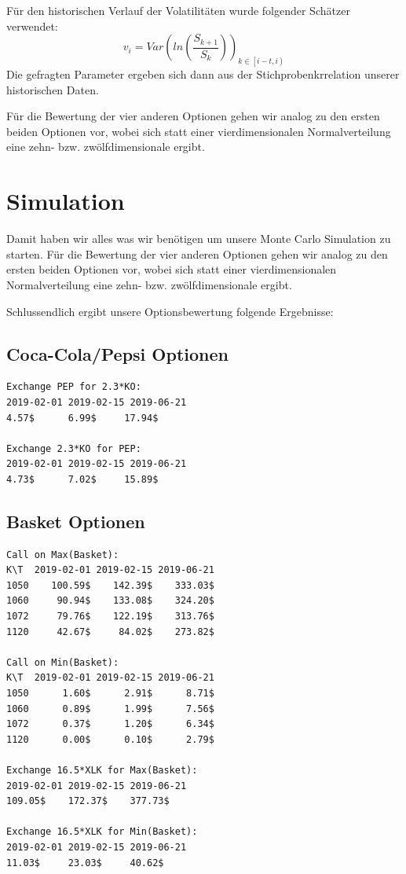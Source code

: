 \documentclass[12pt]{article}
\begin{document}
Für den historischen Verlauf der Volatilitäten wurde folgender Schätzer verwendet:
\begin{equation*}
v_i=Var\left(ln\left(\frac{S_{k+1}}{S_k}\right)\right)_{k\in\left[i-t,i\right)}
\end{equation*}
Die gefragten Parameter ergeben sich dann aus der Stichprobenkrrelation unserer historischen Daten.

Für die Bewertung der vier anderen Optionen gehen wir analog zu den ersten beiden Optionen vor, wobei sich statt einer vierdimensionalen Normalverteilung eine zehn- bzw. zwölfdimensionale ergibt.



\section*{Simulation}

Damit haben wir alles was wir benötigen um unsere Monte Carlo Simulation zu starten.
Für die Bewertung der vier anderen Optionen gehen wir analog zu den ersten beiden Optionen vor, wobei sich statt einer vierdimensionalen Normalverteilung eine zehn- bzw. zwölfdimensionale ergibt.



	Schlussendlich ergibt unsere Optionsbewertung folgende Ergebnisse:
\subsection*{Coca-Cola/Pepsi Optionen}

\begin{verbatim}
Exchange PEP for 2.3*KO:
2019-02-01 2019-02-15 2019-06-21
4.57$      6.99$     17.94$ 

Exchange 2.3*KO for PEP:
2019-02-01 2019-02-15 2019-06-21
4.73$      7.02$     15.89$
\end{verbatim}


\subsection*{Basket Optionen}



\begin{verbatim}
Call on Max(Basket):
K\T  2019-02-01 2019-02-15 2019-06-21
1050    100.59$    142.39$    333.03$ 
1060     90.94$    133.08$    324.20$ 
1072     79.76$    122.19$    313.76$ 
1120     42.67$     84.02$    273.82$ 

Call on Min(Basket):
K\T  2019-02-01 2019-02-15 2019-06-21
1050      1.60$      2.91$      8.71$ 
1060      0.89$      1.99$      7.56$ 
1072      0.37$      1.20$      6.34$ 
1120      0.00$      0.10$      2.79$ 

Exchange 16.5*XLK for Max(Basket):
2019-02-01 2019-02-15 2019-06-21
109.05$    172.37$    377.73$ 

Exchange 16.5*XLK for Min(Basket):
2019-02-01 2019-02-15 2019-06-21
11.03$     23.03$     40.62$ 
\end{verbatim}
\end{document}
